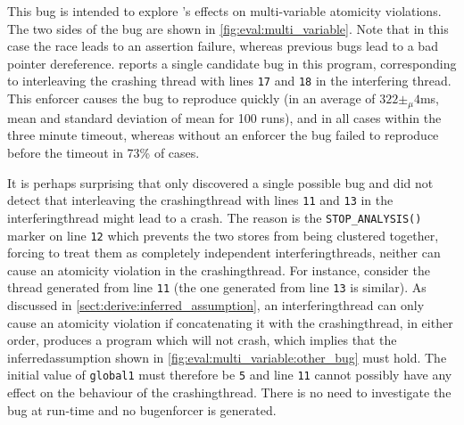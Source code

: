 This bug is intended to explore {\technique}'s effects on
multi-variable atomicity violations.  The two sides of the bug are
shown in \autoref{fig:eval:multi_variable}.  Note that in this case
the race leads to an assertion failure, whereas previous bugs lead to
a bad pointer dereference.  {\Technique} reports a single candidate
bug in this program, corresponding to interleaving the crashing thread
with lines \texttt{17} and \texttt{18} in the interfering thread.  This
enforcer causes the bug to reproduce quickly (in an average of $322
\pm_\mu 4$ms, mean and standard deviation of mean for 100 runs), and
in all cases within the three minute timeout, whereas without an
enforcer the bug failed to reproduce before the timeout in 73\% of
cases.

It is perhaps surprising that {\technique} only discovered a single
possible bug and did not detect that interleaving the
\gls{crashingthread} with lines \texttt{11} and \texttt{13} in the
\gls{interferingthread} might lead to a crash.  The reason is the
\texttt{STOP\_ANALYSIS()} marker on line \texttt{12} which prevents
the two stores from being clustered together, forcing {\technique} to
treat them as completely independent \glspl{interferingthread},
neither can cause an atomicity violation in the \gls{crashingthread}.
For instance, consider the thread generated from line \texttt{11} (the
one generated from line \texttt{13} is similar).  As discussed in
\autoref{sect:derive:inferred_assumption}, an \gls{interferingthread}
can only cause an atomicity violation if concatenating it with the
\gls{crashingthread}, in either order, produces a program which will
not crash, which implies that the \gls{inferredassumption} shown in
\autoref{fig:eval:multi_variable:other_bug} must hold.  The initial
value of \texttt{global1} must therefore be \texttt{5} and line
\texttt{11} cannot possibly have any effect on the behaviour of the
\gls{crashingthread}.  There is no need to investigate the bug at
run-time and no \gls{bugenforcer} is generated.

